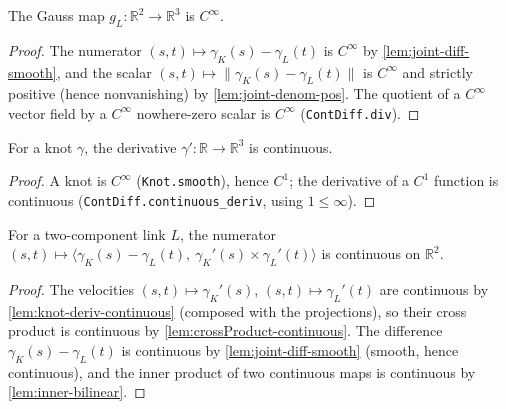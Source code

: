 \begin{lemma}
    \label{lem:gauss-map-smooth}
    \leanok
    The Gauss map $g_L : \mathbb{R}^2 \to \mathbb{R}^3$ is $C^\infty$.
\end{lemma}
\begin{proof}
    The numerator $(s,t)\mapsto\gamma_K(s)-\gamma_L(t)$ is $C^\infty$ by
    \cref{lem:joint-diff-smooth}, and the scalar $(s,t)\mapsto\lVert\gamma_K(s)-
    \gamma_L(t)\rVert$ is $C^\infty$ and strictly positive (hence nonvanishing) by
    \cref{lem:joint-denom-pos}. The quotient of a $C^\infty$ vector field by a
    $C^\infty$ nowhere-zero scalar is $C^\infty$ (\texttt{ContDiff.div}).
\end{proof}

\begin{lemma}
    \label{lem:knot-deriv-continuous}
    For a knot $\gamma$, the derivative $\gamma' : \mathbb{R}\to\mathbb{R}^3$ is
    continuous.
\end{lemma}
\begin{proof}
    A knot is $C^\infty$ (\texttt{Knot.smooth}), hence $C^1$; the derivative of a
    $C^1$ function is continuous (\texttt{ContDiff.continuous\_deriv}, using
    $1\le\infty$).
\end{proof}

\begin{lemma}
    \label{lem:integrand-numerator-continuous}
    For a two-component link $L$, the numerator
    $(s,t)\mapsto\bigl\langle \gamma_K(s)-\gamma_L(t),\ \gamma_K'(s)\times\gamma_L'(t)\bigr\rangle$
    is continuous on $\mathbb{R}^2$.
\end{lemma}
\begin{proof}
    The velocities $(s,t)\mapsto\gamma_K'(s)$, $(s,t)\mapsto\gamma_L'(t)$ are
    continuous by \cref{lem:knot-deriv-continuous} (composed with the projections),
    so their cross product is continuous by \cref{lem:crossProduct-continuous}. The
    difference $\gamma_K(s)-\gamma_L(t)$ is continuous by \cref{lem:joint-diff-smooth}
    (smooth, hence continuous), and the inner product of two continuous maps is
    continuous by \cref{lem:inner-bilinear}.
\end{proof}

